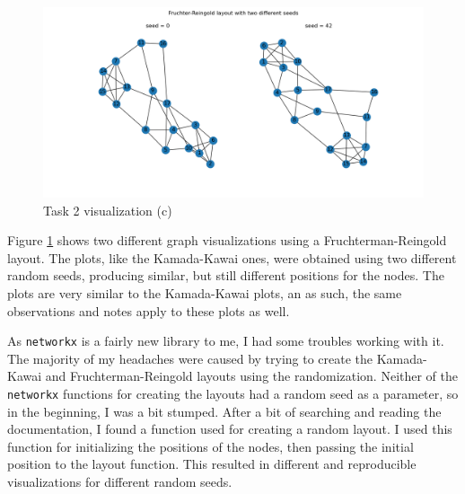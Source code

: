 \documentclass[11pt,a4paper,titlepage]{article}
\begin{document}
\begin{figure}[h!]
    \centering
    \includegraphics[width=1.0\linewidth]{reports/assignment-4/imgs/fr.png}
    \caption{Task 2 visualization (c)}
    \label{fig:fr}
\end{figure}

Figure \ref{fig:fr} shows two different graph visualizations using a Fruchterman-Reingold layout. The plots, like the Kamada-Kawai ones, were obtained using two different random seeds, producing similar, but still different positions for the nodes. The plots are very similar to the Kamada-Kawai plots, an as such, the same observations and notes apply to these plots as well.

As \texttt{networkx} is a fairly new library to me, I had some troubles working with it. The majority of my headaches were caused by trying to create the Kamada-Kawai and Fruchterman-Reingold layouts using the randomization. Neither of the \texttt{networkx} functions for creating the layouts had a random seed as a parameter, so in the beginning, I was a bit stumped. After a bit of searching and reading the documentation, I found a function used for creating a random layout. I used this function for initializing the positions of the nodes, then passing the initial position to the layout function. This resulted in different and reproducible visualizations for different random seeds.

\newpage


\end{document}
